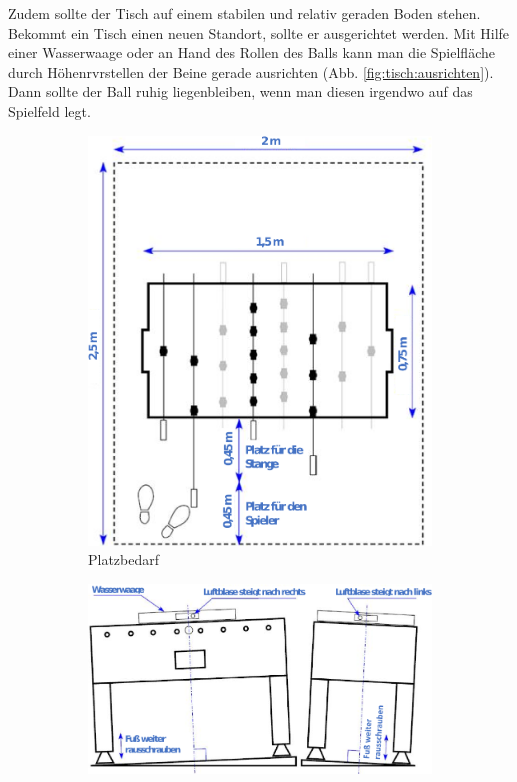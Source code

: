 Zudem sollte der Tisch auf einem stabilen und relativ geraden Boden stehen. Bekommt ein Tisch einen neuen Standort, sollte er ausgerichtet werden. Mit Hilfe einer Wasserwaage oder an Hand des Rollen des Balls kann man die Spielfläche durch Höhenrvrstellen der Beine gerade ausrichten (Abb. \ref{fig:tisch:ausrichten}). Dann sollte der Ball ruhig liegenbleiben, wenn man diesen irgendwo auf das Spielfeld legt.

\begin{figure}
\centering 
\begin{subfigure}[b]{0.7\textwidth} 
\includegraphics[width=\textwidth]{img/tisch_platzbedarf.png} 
\caption{Platzbedarf} 
\label{fig:tisch:platzbedarf} 
\vspace{0.5cm}
\end{subfigure} 
\begin{subfigure}[b]{0.7\textwidth} 
\includegraphics[width=\textwidth]{img/tisch_ausrichten.png} 

\end{subfigure}
\end{figure}
